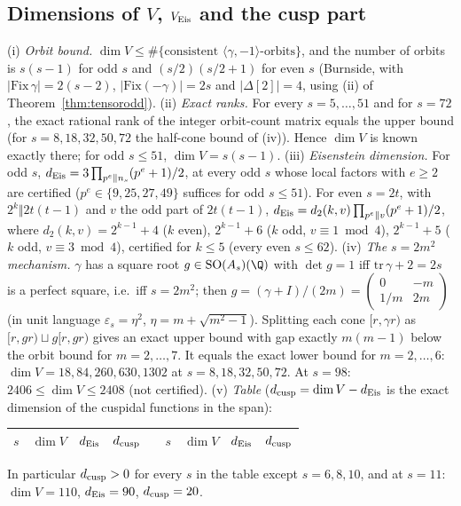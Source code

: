 \subsection{Dimensions of $V$, $V_{\rm Eis}$ and the cusp part}
\begin{theorem}[Dimensions]\label{thm:dims}
(i) \emph{Orbit bound.} $\dim V\le\#\{\text{consistent }\langle\gamma,-1\rangle\text{-orbits}\}$, and the number of orbits is $s(s-1)$ for odd $s$ and
$(s/2)(s/2+1)$ for even $s$ (Burnside, with $|\mathrm{Fix}\,\gamma|=2(s-2)$, $|\mathrm{Fix}(-\gamma)|=2s$ and $|\Delta[2]|=4$, using (ii) of Theorem~\ref{thm:tensorodd}).
(ii) \emph{Exact ranks.} For every $s=5,\dots,51$ and for $s=72$, the exact rational rank of the integer orbit-count matrix equals the upper bound
(for $s=8,18,32,50,72$ the half-cone bound of (iv)). Hence $\dim V$ is known exactly there; for odd $s\le51$, $\dim V=s(s-1)$.
(iii) \emph{Eisenstein dimension.} For odd $s$, $d_{\rm Eis}=3\prod_{p^e\Vert n_s}(p^e+1)/2$, at every odd $s$ whose local factors with $e\ge2$ are certified
($p^e\in\{9,25,27,49\}$ suffices for odd $s\le51$). For even $s=2t$, with $2^k\Vert2t(t-1)$ and $v$ the odd part of $2t(t-1)$,
$d_{\rm Eis}=d_2(k,v)\prod_{p^e\Vert v}(p^e+1)/2$, where $d_2(k,v)=2^{k-1}+4$ ($k$ even), $2^{k-1}+6$ ($k$ odd, $v\equiv1\bmod4$), $2^{k-1}+5$ ($k$ odd,
$v\equiv3\bmod4$), certified for $k\le5$ (every even $s\le62$).
(iv) \emph{The $s=2m^2$ mechanism.} $\gamma$ has a square root $g\in\mathrm{SO}(A_s)(\Q)$ with $\det g=1$ iff $\mathrm{tr}\,\gamma+2=2s$ is a perfect square, i.e.\ iff
$s=2m^2$; then $g=(\gamma+I)/(2m)=\begin{pmatrix}0&-m\\1/m&2m\end{pmatrix}$ (in unit language $\varepsilon_s=\eta^2$, $\eta=m+\sqrt{m^2-1}$). Splitting each cone
$[r,\gamma r)$ as $[r,gr)\sqcup g[r,gr)$ gives an exact upper bound with gap exactly $m(m-1)$ below the orbit bound for $m=2,\dots,7$. It equals the exact lower
bound for $m=2,\dots,6$: $\dim V=18,84,260,630,1302$ at $s=8,18,32,50,72$. At $s=98$: $2406\le\dim V\le2408$ (not certified).
(v) \emph{Table} ($d_{\rm cusp}=\dim V-d_{\rm Eis}$ is the exact dimension of the cuspidal functions in the span):
\begin{center}\small
\begin{longtable}{rrrrcrrrr}\toprule
$s$ & $\dim V$ & $d_{\rm Eis}$ & $d_{\rm cusp}$ && $s$ & $\dim V$ & $d_{\rm Eis}$ & $d_{\rm cusp}$\\\midrule\endhead

\bottomrule
\end{longtable}
\end{center}
In particular $d_{\rm cusp}>0$ for every $s$ in the table except $s=6,8,10$, and at $s=11$: $\dim V=110$, $d_{\rm Eis}=90$, $d_{\rm cusp}=20$.
\end{theorem}
